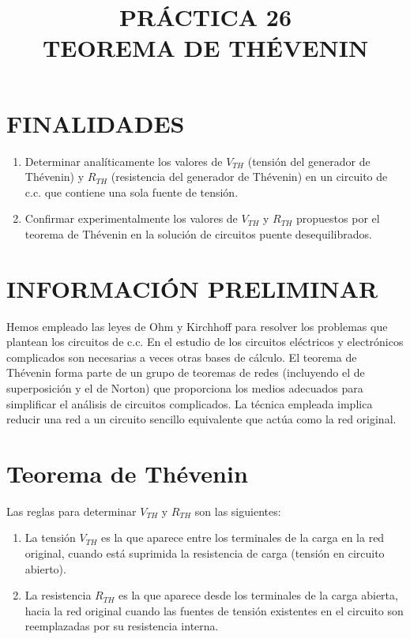 \documentclass{article}
\title{\textbf{PRÁCTICA 26 \\ TEOREMA DE THÉVENIN}}
\author{}
\date{}
\begin{document}
\maketitle
\thispagestyle{empty}

\section*{FINALIDADES}
\begin{enumerate}[label=\arabic*.]
    \item Determinar analíticamente los valores de \(V_{TH}\) (tensión del generador de Thévenin) y \(R_{TH}\) (resistencia del generador de Thévenin) en un circuito de c.c. que contiene una sola fuente de tensión.
    \item Confirmar experimentalmente los valores de \(V_{TH}\) y \(R_{TH}\) propuestos por el teorema de Thévenin en la solución de circuitos puente desequilibrados.
\end{enumerate}

\section*{INFORMACIÓN PRELIMINAR}
Hemos empleado las leyes de Ohm y Kirchhoff para resolver los problemas que plantean los circuitos de c.c. En el estudio de los circuitos eléctricos y electrónicos complicados son necesarias a veces otras bases de cálculo. El teorema de Thévenin forma parte de un grupo de teoremas de redes (incluyendo el de superposición y el de Norton) que proporciona los medios adecuados para simplificar el análisis de circuitos complicados. La técnica empleada implica reducir una red a un circuito sencillo equivalente que actúa como la red original.

\section*{Teorema de Thévenin}
Las reglas para determinar \( V_{TH} \) y \( R_{TH} \) son las siguientes:

\begin{enumerate}[label=\arabic*.]
    \item La tensión \( V_{TH} \) es la que aparece entre los terminales de la carga en la red original, cuando está suprimida la resistencia de carga (tensión en circuito abierto).
    
    \item La resistencia \( R_{TH} \) es la que aparece desde los terminales de la carga abierta, hacia la red original cuando las fuentes de tensión existentes en el circuito son reemplazadas por su resistencia interna.
\end{enumerate}
\end{document}
